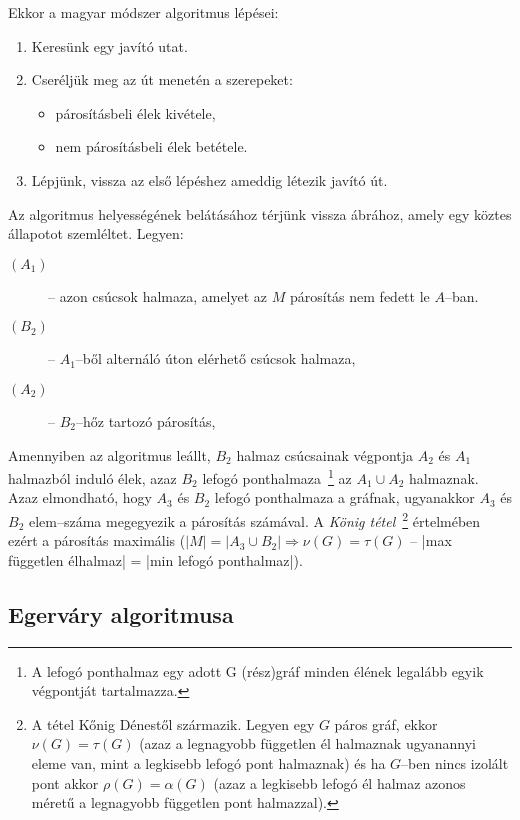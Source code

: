 Ekkor a magyar módszer algoritmus lépései:

\begin{enumerate}
	\item Keresünk egy javító utat.
	\item Cseréljük meg az út menetén a szerepeket:
	      \begin{itemize}
		      \item párosításbeli élek kivétele,
		      \item nem párosításbeli élek betétele.
	      \end{itemize}
	\item Lépjünk, vissza az első lépéshez ameddig létezik javító út.
\end{enumerate}

Az algoritmus helyességének belátásához térjünk vissza  ábrához,
amely egy köztes állapotot szemléltet. Legyen:
\begin{description}
	\item[$(A_1)$] -- azon csúcsok halmaza, amelyet az $M$ párosítás nem fedett le $A$--ban.
	\item[$(B_2)$] -- $A_1$--ből alternáló úton elérhető csúcsok halmaza,
	\item[$(A_2)$] -- $B_2$--hőz tartozó párosítás,
\end{description}

Amennyiben az algoritmus leállt, $B_2$ halmaz csúcsainak végpontja $A_2$ és
$A_1$ halmazból induló élek, azaz $B_2$ lefogó ponthalmaza~\footnote{A lefogó
	ponthalmaz egy adott G (rész)gráf minden élének legalább egyik végpontját tartalmazza.} az $A_1
	\cup A_2$ halmaznak. Azaz elmondható, hogy $A_3$ és $B_2$ lefogó ponthalmaza a
gráfnak, ugyanakkor $A_3$ és $B_2$ elem--száma megegyezik a párosítás számával.
A \emph{König tétel}~\footnote{ A tétel Kőnig Dénestől származik. Legyen egy $G$
	páros gráf, ekkor $\nu(G)=\tau(G)$ (azaz a legnagyobb független él halmaznak
	ugyanannyi eleme van, mint a legkisebb lefogó pont halmaznak) és ha $G$--ben
	nincs izolált pont akkor $\rho(G)=\alpha(G)$ (azaz a legkisebb lefogó él halmaz
	azonos méretű a legnagyobb független pont halmazzal).} értelmében ezért a
párosítás maximális ($ |M|=|A_3 \cup B_2| \Rightarrow \nu(G) = \tau(G)$
-- |max független élhalmaz| = |min lefogó ponthalmaz|).

\subsection{Egerváry algoritmusa}

